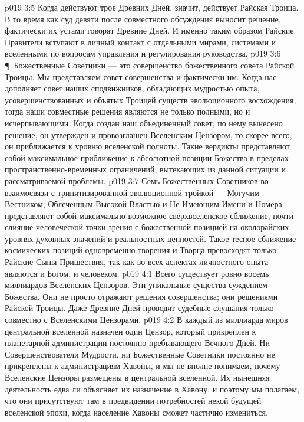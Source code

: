 \vs p019 3:5 Когда действуют трое Древних Дней, значит, действует Райская Троица. В то время как суд девяти после совместного обсуждения выносит решение, фактически их устами говорят Древние Дней. И именно таким образом Райские Правители вступают в личный контакт с отдельными мирами, системами и вселенными по вопросам управления и регулирования руководства.
\vs p019 3:6 \P\ Божественные Советники --- это совершенство божественного совета Райской Троицы. Мы представляем совет совершенства и фактически  им. Когда нас дополняет совет наших сподвижников, обладающих мудростью опыта, усовершенствованных и объятых Троицей существ эволюционного восхождения, тогда наши совместные решения являются не только полными, но и исчерпывающими. Когда создан наш объединенный совет, по нему вынесено решение, он утвержден и провозглашен Вселенским Цензором, то скорее всего, он приближается к уровню вселенской полноты. Такие вердикты представляют собой максимальное приближение к абсолютной позиции Божества в пределах пространственно\hyp{}временных ограничений, вытекающих из данной ситуации и рассматриваемой проблемы.
\vs p019 3:7 Семь Божественных Советников во взаимосвязи с тринитизированной эволюционной тройкой --- Могучим Вестником, Облеченным Высокой Властью и Не Имеющим Имени и Номера --- представляют собой максимально возможное сверхвселенское сближение, почти слияние человеческой точки зрения с божественной позицией на околорайских уровнях духовных значений и реальностных ценностей. Такое тесное сближение космических позиций одновременно творения и Творца превосходят только Райские Сыны Пришествия, так как во всех аспектах личностного опыта являются и Богом, и человеком.
\vs p019 4:1 Всего существует ровно восемь миллиардов Вселенских Цензоров. Эти уникальные существа  суждением Божества. Они не просто отражают решения совершенства; они  решениями Райской Троицы. Даже Древние Дней проводят судебные слушания только совместно с Вселенскими Цензорами.
\vs p019 4:2 В каждый из миллиарда миров центральной вселенной назначен один Цензор, который прикреплен к планетарной администрации постоянно пребывающего Вечного Дней. Ни Совершенствователи Мудрости, ни Божественные Советники постоянно не прикреплены к администрациям Хавоны, и мы не вполне понимаем, почему Вселенские Цензоры размещены в центральной вселенной. Их нынешняя деятельность едва ли объясняет их назначение в Хавону, и поэтому мы полагаем, что они присутствуют там в предвидении потребностей некой будущей вселенской эпохи, когда население Хавоны сможет частично измениться.
